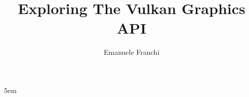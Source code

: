 \documentclass[a4paper]{report}
\author{Emanuele Franchi}
\title{Exploring The Vulkan Graphics API}
\begin{document}
\emergencystretch 5em

\maketitle






\tableofcontents
\listoffigures
\lstlistoflistings














\appendix




\nocite{*}

\end{document}
